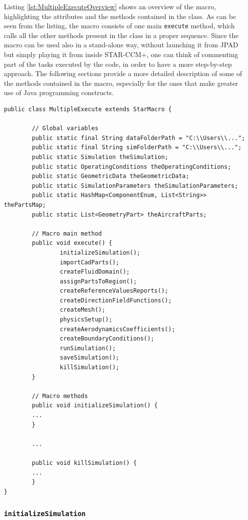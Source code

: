 %
Listing \ref{lst:MultipleExecuteOverview} shows an overview of the macro, highlighting the attributes and the methods contained in the class. As can be seen from the listing, the macro consists of one main \lstinline[language=Java]!execute! method, which calls all the other methods present in the class in a proper sequence. Since the macro can be used also in a stand-alone way, without launching it from \gls{JPAD} but simply playing it from inside STAR-CCM+, one can think of commenting part of the tasks executed by the code, in order to have a more step-by-step approach. The following sections provide a more detailed description of some of the methods contained in the macro, especially for the ones that make greater use of Java programming constructs.
\bigskip
\begin{lstlisting}[caption={\lstinline!MultipleExecute! macro overview}, captionpos=b, tabsize=2, label={lst:MultipleExecuteOverview}]
public class MultipleExecute extends StarMacro {
	
		// Global variables
		public static final String dataFolderPath = "C:\\Users\\...";
		public static final String simFolderPath = "C:\\Users\\...";
		public static Simulation theSimulation;
		public static OperatingConditions theOperatingConditions;
		public static GeometricData theGeometricData;
		public static SimulationParameters theSimulationParameters;
		public static HashMap<ComponentEnum, List<String>> thePartsMap;
		public static List<GeometryPart> theAircraftParts;

		// Macro main method
		public void execute() {
				initializeSimulation();
				importCadParts();
				createFluidDomain();
				assignPartsToRegion();
				createReferenceValuesReports();
				createDirectionFieldFunctions();
				createMesh();
				physicsSetup();
				createAerodynamicsCoefficients();
				createBoundaryConditions();
				runSimulation();
				saveSimulation();
				killSimulation();
		}
	
		// Macro methods
		public void initializeSimulation() {
		...
		}
	
		...
	
		public void killSimulation() {
		...
		}
}	
\end{lstlisting}

\subsubsection{\texttt{initializeSimulation}}

